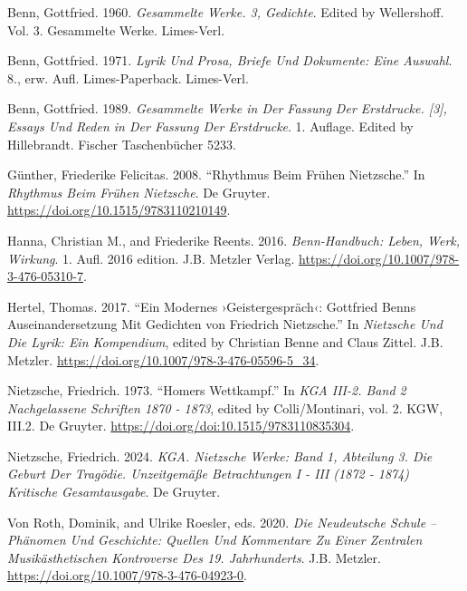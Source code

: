 \documentclass[
  letterpaper,
  DIV=11,
  numbers=noendperiod]{scrartcl}
\newlength{\cslhangindent}
\newenvironment{CSLReferences}[2] %
 {\begin{list}{}{%
  \setlength{\itemindent}{0pt}
  \setlength{\leftmargin}{0pt}
  \setlength{\parsep}{0pt}
  \ifodd #1
   \setlength{\leftmargin}{\cslhangindent}
   \setlength{\itemindent}{-1\cslhangindent}
  \fi
  \setlength{\itemsep}{#2\baselineskip}}}
 {\end{list}}
\begin{document}
\protect{}\label{refs}
\begin{CSLReferences}{1}{1}
Benn, Gottfried. 1960. \emph{Gesammelte {Werke}. 3, {Gedichte}}. Edited
by Wellershoff. Vol. 3. Gesammelte {Werke}. Limes-Verl.

Benn, Gottfried. 1971. \emph{Lyrik Und {Prosa}, {Briefe} Und
{Dokumente}: Eine {Auswahl}}. 8., erw. Aufl. Limes-{Paperback}.
Limes-Verl.

Benn, Gottfried. 1989. \emph{Gesammelte {Werke} in Der {Fassung} Der
{Erstdrucke}. {[}3{]}, {Essays} Und {Reden} in Der {Fassung} Der
{Erstdrucke}}. 1. Auflage. Edited by Hillebrandt. Fischer
{Taschenbücher} 5233.

Günther, Friederike Felicitas. 2008. {``Rhythmus Beim Frühen
{Nietzsche}.''} In \emph{Rhythmus Beim Frühen {Nietzsche}}. De Gruyter.
\url{https://doi.org/10.1515/9783110210149}.

Hanna, Christian M., and Friederike Reents. 2016. \emph{Benn-{Handbuch}:
{Leben}, {Werk}, {Wirkung}}. 1. Aufl. 2016 edition. J.B. Metzler Verlag.
\url{https://doi.org/10.1007/978-3-476-05310-7}.

Hertel, Thomas. 2017. {``Ein Modernes ›{Geistergespräch}‹: {Gottfried}
{Benns} {Auseinandersetzung} Mit {Gedichten} von {Friedrich}
{Nietzsche}.''} In \emph{Nietzsche Und Die {Lyrik}: {Ein} {Kompendium}},
edited by Christian Benne and Claus Zittel. J.B. Metzler.
\url{https://doi.org/10.1007/978-3-476-05596-5_34}.

Nietzsche, Friedrich. 1973. {``Homers {Wettkampf}.''} In \emph{{KGA}
{III}-2. {Band} 2 {Nachgelassene} {Schriften} 1870 - 1873}, edited by
Colli/Montinari, vol. 2. {KGW}, III.2. De Gruyter.
\url{https://doi.org/doi:10.1515/9783110835304}.

Nietzsche, Friedrich. 2024. \emph{{KGA}. {Nietzsche} {Werke}: {Band} 1,
{Abteilung} 3. {Die} {Geburt} Der {Tragödie}. {Unzeitgemäße}
{Betrachtungen} {I} - {III} (1872 - 1874) {Kritische} {Gesamtausgabe}}.
De Gruyter.

Von Roth, Dominik, and Ulrike Roesler, eds. 2020. \emph{Die
{Neudeutsche} {Schule} -- {Phänomen} Und {Geschichte}: {Quellen} Und
{Kommentare} Zu Einer Zentralen Musikästhetischen {Kontroverse} Des 19.
{Jahrhunderts}}. J.B. Metzler.
\url{https://doi.org/10.1007/978-3-476-04923-0}.

\end{CSLReferences}
\end{document}
